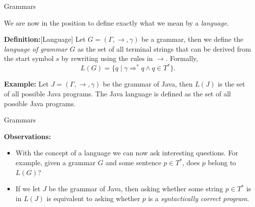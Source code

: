\documentclass{beamer}
\begin{document}
\begin{frame}[fragile]{Grammars}

\small
We are now in the position to define exactly what we mean by a {\em language}.

\vspace{.2in}
{\bf Definition:}[Language] Let $G = (\Gamma,\rightarrow,\gamma)$ be a grammar, then we define the {\em language of
grammar $G$} as the set of all terminal strings that can be derived from the start symbol $s$ by rewriting
using the rules in $\rightarrow$.  Formally,
\[
L(G) = \{ q \mid \gamma \Rightarrow^* q \wedge q\in T^*\}.
\]

\vspace{.3in}
{\bf Example:} Let $J = (\Gamma,\rightarrow,\gamma)$ be the grammar of Java, then $L(J)$ is the set of all possible Java
programs.  The Java language is defined as the set of all possible Java programs.
\end{frame}


\begin{frame}[fragile]{Grammars}

\small
{\bf Observations:}
\begin{itemize}
\item
With the concept of a language we can now ask interesting questions.  For example,
given a grammar $G$ and some sentence $p\in T^*$, does $p$ belong to $L(G)$?
\item
If we let $J$ be the grammar of Java, then asking whether some string $p\in T^*$ is in $L(J)$
is equivalent to asking whether $p$ is a {\em syntactically correct program}.
\end{itemize}

\end{frame}
\end{document}
